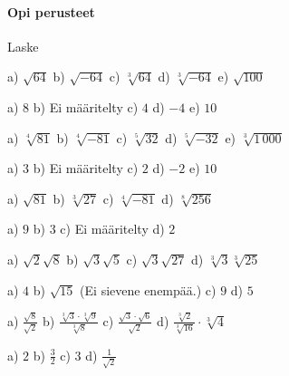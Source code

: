 \begin{tehtavasivu}

\paragraph*{Opi perusteet}

Laske
\begin{tehtava}
a) $\sqrt{64}$ \quad b) $\sqrt{-64}$ \quad c) $\sqrt[3]{64}$ \quad d) $\sqrt[3]{-64}$ \quad  e) $\sqrt{100}$

\begin{vastaus}
a) $8$ b) Ei määritelty c) $4$ d) $-4$  e) $10$
\end{vastaus}
\end{tehtava}

\begin{tehtava}
a) $\sqrt[4]{81}$ \quad b) $\sqrt[4]{-81}$ \quad c) $\sqrt[5]{32}$ \quad d) $\sqrt[5]{-32}$  e) $\sqrt[3]{1\,000}$

\begin{vastaus}
a) $3$ b) Ei määritelty c) $2$ d) $-2$  e) $10$
\end{vastaus}
\end{tehtava}

\begin{tehtava}
a) $\sqrt{81}$ \quad b) $\sqrt[3]{27}$ \quad c) $\sqrt[4]{-81}$ \quad d) $\sqrt[8]{256}$ 

\begin{vastaus}
a) $9$ b) $3$ c) Ei määritelty d) $2$
\end{vastaus}
\end{tehtava}

\begin{tehtava} %
a) $\sqrt{2}\sqrt{8}$  \quad b)  $\sqrt{3}\sqrt{5}$ \quad c)  $\sqrt{3}\sqrt{27}$ \quad  d) $\sqrt[3]{3}\sqrt[3]{25} $
\begin{vastaus}
a) $4$ \quad b) $\sqrt{15}$ (Ei sievene enempää.)  \quad c) $9$ \quad d) $5$
\end{vastaus}
\end{tehtava}


\begin{tehtava} 
a) $ \frac{\sqrt{8}}{\sqrt{2}}$  \quad b)   $ \frac{\sqrt[3]{3} \cdot \sqrt[3]{9}}{\sqrt[3]{8}}$   \quad c)  $ \frac{\sqrt{3} \cdot \sqrt{6}}{\sqrt{2}}$ \quad d) $ \frac {\sqrt[3]{2}}{\sqrt[3]{16}} \cdot \sqrt[3]{4}$ 
\begin{vastaus}
a) $2$ \quad b) $\frac{3}{2}$  \quad c) $3$ \quad d) $\frac{1}{\sqrt{2}}$
\end{vastaus}
\end{tehtava}



\end{tehtavasivu}
